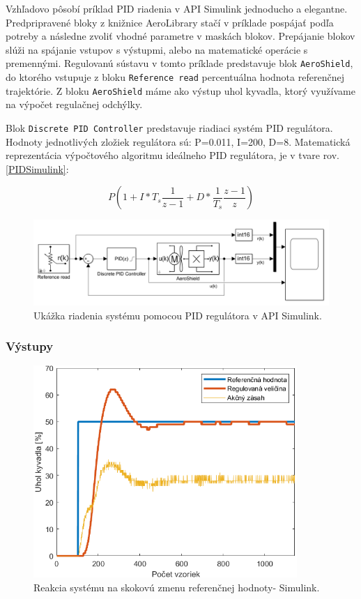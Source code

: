 Vzhľadovo pôsobí príklad PID riadenia v API Simulink jednoducho a elegantne. Predpripravené bloky z knižnice AeroLibrary stačí v príklade pospájať podľa potreby a následne zvoliť vhodné parametre v maskách blokov. Prepájanie blokov slúži na spájanie vstupov s výstupmi, alebo na matematické operácie s premennými. Regulovanú sústavu v tomto príklade predstavuje blok \verb|AeroShield|, do ktorého vstupuje z bloku \verb|Reference read| percentuálna hodnota referenčnej trajektórie. Z bloku \verb|AeroShield| máme ako výstup uhol kyvadla, ktorý využívame na výpočet regulačnej odchýlky.  

Blok \verb|Discrete PID Controller| predstavuje riadiaci systém PID regulátora. Hodnoty jednotlivých zložiek regulátora sú: P=0.011, I=200, D=8. Matematická reprezentácia výpočtového algoritmu ideálneho PID regulátora, je v tvare rov.\ref{PIDSimulink}:

\begin{equation}\label{PIDSimulink}
	P\left(1+I*T_s\dfrac{1}{z-1}+D*\dfrac{1}{T_s}\dfrac{z-1}{z}\right)
\end{equation}


\begin{figure}[!tbh]
	\centering
	\includegraphics[width=125mm]{obr/SimulinkPID.png}
	\caption{Ukážka riadenia systému pomocou PID regulátora v API Simulink.}\label{OBRAZOK 2.6.10}
\end{figure}

\subsubsection{Výstupy}

\begin{figure}[!tbh]
	\centering
	\includegraphics[width=100mm]{obr/SimSkok.png}
	\caption{Reakcia systému na skokovú zmenu referenčnej hodnoty- Simulink.}\label{OBRAZOK 2.6.11}
\end{figure}

